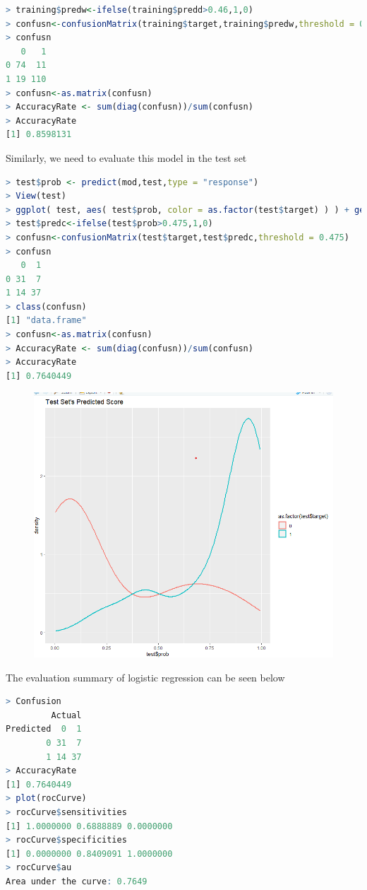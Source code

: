 \documentclass{article}
\begin{document}
\begin{lstlisting}[language=R]
> training$predw<-ifelse(training$predd>0.46,1,0)
> confusn<-confusionMatrix(training$target,training$predw,threshold = 0.46)
> confusn
   0   1
0 74  11
1 19 110
> confusn<-as.matrix(confusn)
> AccuracyRate <- sum(diag(confusn))/sum(confusn)
> AccuracyRate
[1] 0.8598131
\end{lstlisting}
Similarly, we need to evaluate this model in the test set
\begin{lstlisting}[language=R]
> test$prob <- predict(mod,test,type = "response")
> View(test)
> ggplot( test, aes( test$prob, color = as.factor(test$target) ) ) + geom_density( size = 1 ) + ggtitle( "Test Set's Predicted Score" )
> test$predc<-ifelse(test$prob>0.475,1,0)
> confusn<-confusionMatrix(test$target,test$predc,threshold = 0.475)
> confusn
   0  1
0 31  7
1 14 37
> class(confusn)
[1] "data.frame"
> confusn<-as.matrix(confusn)
> AccuracyRate <- sum(diag(confusn))/sum(confusn)
> AccuracyRate
[1] 0.7640449
\end{lstlisting}
\begin{figure}[H]
  \centering
  \includegraphics[width=1\textwidth]{task1_1_testScore.png}
\end{figure}
The evaluation summary of logistic regression can be seen below
\begin{lstlisting}[language=R]
  > Confusion
         Actual
Predicted  0  1
        0 31  7
        1 14 37
> AccuracyRate
[1] 0.7640449
> plot(rocCurve)
> rocCurve$sensitivities
[1] 1.0000000 0.6888889 0.0000000
> rocCurve$specificities
[1] 0.0000000 0.8409091 1.0000000
> rocCurve$au
Area under the curve: 0.7649
\end{lstlisting}
\end{document}

